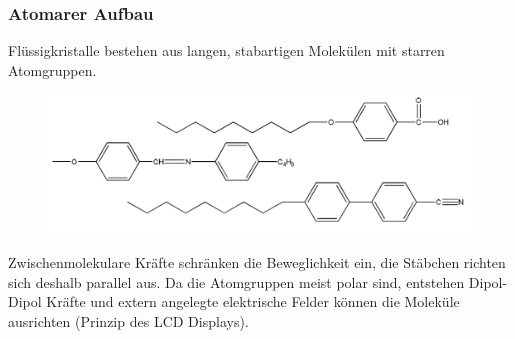 \subsubsection{Atomarer Aufbau}
Flüssigkristalle bestehen aus langen, stabartigen Molekülen mit starren Atomgruppen. 

\begin{figure}[htbp]
	\centering
	\includegraphics[width=0.8\linewidth]{images/11_Atome.png}
\end{figure}

Zwischenmolekulare Kräfte schränken die Beweglichkeit ein, die Stäbchen richten sich deshalb parallel aus. Da die Atomgruppen meist polar sind, entstehen Dipol-Dipol Kräfte und extern angelegte elektrische Felder können die Moleküle ausrichten (Prinzip des LCD Displays). 